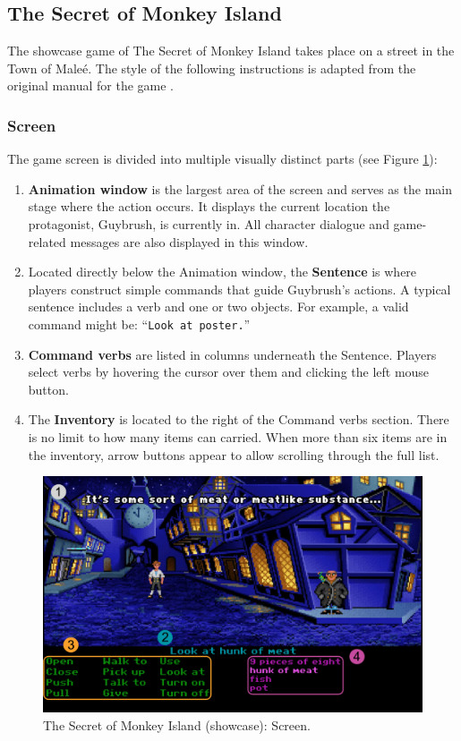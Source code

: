 \subsection{The Secret of Monkey Island}
The showcase game of The Secret of Monkey Island takes place on a street in the Town of Maleé. The style of the following instructions is adapted from the original manual for the game \cite{TSoMI-Manual}.

\subsubsection{Screen}
The game screen is divided into multiple visually distinct parts (see Figure \ref{fig:TSoM-manual}):
\begin{enumerate}
    \item \textbf{Animation window} is the largest area of the screen and serves as the main stage where the action occurs. It displays the current location the protagonist, Guybrush, is currently in. All character dialogue and game-related messages are also displayed in this window. 
    \item Located directly below the Animation window, the \textbf{Sentence} is where players construct simple commands that guide Guybrush's actions. A typical sentence includes a verb and one or two objects. For example, a valid command might be: “\verb|Look at poster.|”
    \item \textbf{Command verbs} are listed in columns underneath the Sentence. Players select verbs by hovering the cursor over them and clicking the left mouse button.
    \item The \textbf{Inventory} is located to the right of the Command verbs section. There is no limit to how many items can carried. When more than six items are in the inventory, arrow buttons appear to allow scrolling through the full list. 
\end{enumerate}

\begin{figure}[H]
\centering
\includegraphics[width=.8\linewidth]{img/tutorial-tsomi.png}
\caption{The Secret of Monkey Island (showcase): Screen.}
\label{fig:TSoM-manual}
\end{figure}

